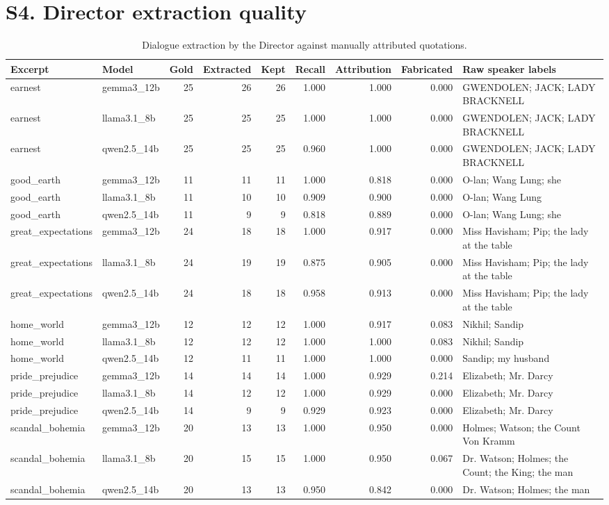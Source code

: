 \documentclass[10pt]{article}
\begin{document}
\section*{S4. Director extraction quality}

{\scriptsize
\begin{longtable}{llrrrrrrp{4cm}}
\caption{Dialogue extraction by the Director against manually attributed quotations.}\\
\toprule
Excerpt & Model & Gold & Extracted & Kept & Recall & Attribution & Fabricated & Raw speaker labels \\
\midrule
\endhead
earnest & gemma3\_12b & 25 & 26 & 26 & 1.000 & 1.000 & 0.000 & GWENDOLEN; JACK; LADY BRACKNELL \\
earnest & llama3.1\_8b & 25 & 25 & 25 & 1.000 & 1.000 & 0.000 & GWENDOLEN; JACK; LADY BRACKNELL \\
earnest & qwen2.5\_14b & 25 & 25 & 25 & 0.960 & 1.000 & 0.000 & GWENDOLEN; JACK; LADY BRACKNELL \\
good\_earth & gemma3\_12b & 11 & 11 & 11 & 1.000 & 0.818 & 0.000 & O-lan; Wang Lung; she \\
good\_earth & llama3.1\_8b & 11 & 10 & 10 & 0.909 & 0.900 & 0.000 & O-lan; Wang Lung \\
good\_earth & qwen2.5\_14b & 11 & 9 & 9 & 0.818 & 0.889 & 0.000 & O-lan; Wang Lung; she \\
great\_expectations & gemma3\_12b & 24 & 18 & 18 & 1.000 & 0.917 & 0.000 & Miss Havisham; Pip; the lady at the table \\
great\_expectations & llama3.1\_8b & 24 & 19 & 19 & 0.875 & 0.905 & 0.000 & Miss Havisham; Pip; the lady at the table \\
great\_expectations & qwen2.5\_14b & 24 & 18 & 18 & 0.958 & 0.913 & 0.000 & Miss Havisham; Pip; the lady at the table \\
home\_world & gemma3\_12b & 12 & 12 & 12 & 1.000 & 0.917 & 0.083 & Nikhil; Sandip \\
home\_world & llama3.1\_8b & 12 & 12 & 12 & 1.000 & 1.000 & 0.083 & Nikhil; Sandip \\
home\_world & qwen2.5\_14b & 12 & 11 & 11 & 1.000 & 1.000 & 0.000 & Sandip; my husband \\
pride\_prejudice & gemma3\_12b & 14 & 14 & 14 & 1.000 & 0.929 & 0.214 & Elizabeth; Mr. Darcy \\
pride\_prejudice & llama3.1\_8b & 14 & 12 & 12 & 1.000 & 0.929 & 0.000 & Elizabeth; Mr. Darcy \\
pride\_prejudice & qwen2.5\_14b & 14 & 9 & 9 & 0.929 & 0.923 & 0.000 & Elizabeth; Mr. Darcy \\
scandal\_bohemia & gemma3\_12b & 20 & 13 & 13 & 1.000 & 0.950 & 0.000 & Holmes; Watson; the Count Von Kramm \\
scandal\_bohemia & llama3.1\_8b & 20 & 15 & 15 & 1.000 & 0.950 & 0.067 & Dr. Watson; Holmes; the Count; the King; the man \\
scandal\_bohemia & qwen2.5\_14b & 20 & 13 & 13 & 0.950 & 0.842 & 0.000 & Dr. Watson; Holmes; the man \\
\bottomrule
\end{longtable}
}
\end{document}
